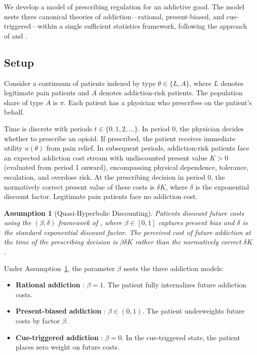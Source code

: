 \documentclass[12pt]{article}
\newtheorem{assumption}{Assumption}
\begin{document}
We develop a model of prescribing regulation for an addictive good. The model nests three canonical theories of addiction---rational, present-biased, and cue-triggered---within a single sufficient statistics framework, following the approach of \citet{chetty2009sufficient} and \citet{allcott2019regressive}.

\subsection{Setup}\label{sec:framework_setup}

Consider a continuum of patients indexed by type $\theta \in \{L, A\}$, where $L$ denotes legitimate pain patients and $A$ denotes addiction-risk patients. The population share of type $A$ is $\pi$. Each patient has a physician who prescribes on the patient's behalf.

Time is discrete with periods $t \in \{0, 1, 2, \ldots\}$. In period 0, the physician decides whether to prescribe an opioid. If prescribed, the patient receives immediate utility $u(\theta)$ from pain relief. In subsequent periods, addiction-risk patients face an expected addiction cost stream with undiscounted present value $K > 0$ (evaluated from period 1 onward), encompassing physical dependence, tolerance, escalation, and overdose risk. At the prescribing decision in period 0, the normatively correct present value of these costs is $\delta K$, where $\delta$ is the exponential discount factor. Legitimate pain patients face no addiction cost.

\begin{assumption}[Quasi-Hyperbolic Discounting]\label{as:discounting}
Patients discount future costs using the $(\beta, \delta)$ framework of \citet{laibson1997golden}, where $\beta \in [0,1]$ captures present bias and $\delta$ is the standard exponential discount factor. The perceived cost of future addiction at the time of the prescribing decision is $\beta \delta K$ rather than the normatively correct $\delta K$.
\end{assumption}

Under Assumption~\ref{as:discounting}, the parameter $\beta$ nests the three addiction models:
\begin{itemize}
\item \textbf{Rational addiction} \citep{becker1988theory}: $\beta = 1$. The patient fully internalizes future addiction costs.
\item \textbf{Present-biased addiction} \citep{gruber2001tobacco, gruber2001risky}: $\beta \in (0, 1)$. The patient underweights future costs by factor $\beta$.
\item \textbf{Cue-triggered addiction} \citep{bernheim2004addiction}: $\beta = 0$. In the cue-triggered state, the patient places zero weight on future costs.
\end{itemize}
\end{document}

